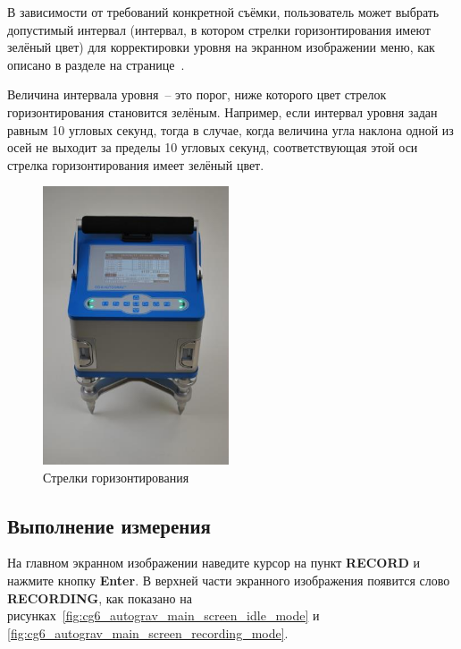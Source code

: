 В зависимости от требований конкретной съёмки, пользователь может выбрать
допустимый интервал (интервал, в котором стрелки горизонтирования имеют зелёный
цвет) для корректировки уровня на экранном изображении меню, как описано в
разделе  на
странице~\pageref{subsec:adjusting_the_level_window}.

Величина интервала уровня~-- это порог, ниже которого цвет стрелок
горизонтирования становится зелёным. Например, если интервал уровня задан равным
10 угловых секунд, тогда в случае, когда величина угла наклона одной из осей не
выходит за пределы \textpm{}10 угловых секунд, соответствующая этой оси стрелка
горизонтирования имеет зелёный цвет.


\begin{figure}[h]
  \centering
  \includegraphics[width=0.49\textwidth]{figures/leveling_arrows}
  \caption{Стрелки горизонтирования}
  \label{fig:leveling_arrows}
\end{figure}


\subsection{Выполнение измерения}

На главном экранном изображении наведите курсор на пункт \textbf{RECORD} и
нажмите кнопку \textbf{Enter}. В верхней части экранного изображения появится
слово \textbf{RECORDING}, как показано на
рисунках~\ref{fig:cg6_autograv_main_screen_idle_mode} и
\ref{fig:cg6_autograv_main_screen_recording_mode}.


